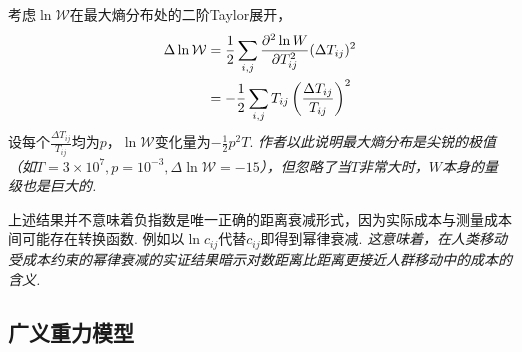 \par 考虑$\ln \mathcal{W}$在最大熵分布处的二阶Taylor展开， 
\begin{align}
    \Delta \ln \mathcal{W}&= \frac{1}{2}\sum_{i,j}\frac{\partial^2 \ln W}{\partial T_{ij}^2} (\Delta T_{ij})^2\notag\\
    &= -\frac{1}{2}\sum_{i,j} T_{ij}\left(\frac{\Delta T_{ij}}{T_{ij}}\right)^2
\end{align}
设每个$\frac{\Delta T_{ij}}{T_{ij}}$均为$p$，$\ln \mathcal{W}$变化量为$-\frac{1}{2}p^2T$. \emph{作者以此说明最大熵分布是尖锐的极值（如$T=3\times 10^7, p=10^{-3}, \Delta \ln \mathcal{W}=-15$），但忽略了当$T$非常大时，$W$本身的量级也是巨大的. }

\par 上述结果并不意味着负指数是唯一正确的距离衰减形式，因为实际成本与测量成本间可能存在转换函数. 例如以$\ln c_{ij}$代替$c_{ij}$即得到幂律衰减. \emph{这意味着，在人类移动受成本约束的幂律衰减的实证结果暗示对数距离比距离更接近人群移动中的成本的含义. } 

\subsection{广义重力模型}

